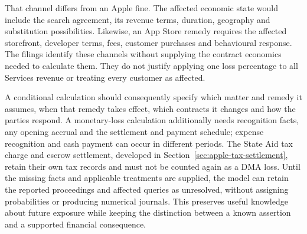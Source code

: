 That channel differs from an Apple fine. The affected economic state would
include the search agreement, its revenue terms, duration, geography and
substitution possibilities. Likewise, an App Store remedy requires the
affected storefront, developer terms, fees, customer purchases and behavioural
response. The filings identify these channels without supplying the contract
economics needed to calculate them. They do not justify applying one loss
percentage to all Services revenue or treating every customer as affected.

A conditional calculation should consequently specify which matter and
remedy it assumes, when that remedy takes effect, which contracts it changes
and how the parties respond. A monetary-loss calculation additionally needs
recognition facts, any opening accrual and the settlement and payment schedule;
expense recognition and cash payment can occur in different periods. The
State Aid tax charge and escrow settlement, developed in
Section~\ref{sec:apple-tax-settlement}, retain their own tax records and must
not be counted again as a DMA loss. Until the missing
facts and applicable treatments are supplied, the model can retain the reported
proceedings and affected queries as unresolved, without assigning probabilities
or producing numerical journals. This preserves useful knowledge about future
exposure while keeping the distinction between a known assertion and a
supported financial consequence.
